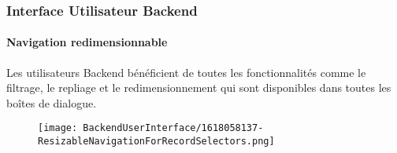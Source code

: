 %

\begin{frame}[fragile]
	\frametitle{Interface Utilisateur Backend}
	\framesubtitle{Navigation redimensionnable}

	Les utilisateurs Backend bénéficient de toutes les fonctionnalités comme le filtrage, le repliage et le redimensionnement
	qui sont disponibles dans toutes les boîtes de dialogue.

	\begin{figure}
		\texttt{[image: BackendUserInterface/1618058137-ResizableNavigationForRecordSelectors.png]}
	\end{figure}

\end{frame}

